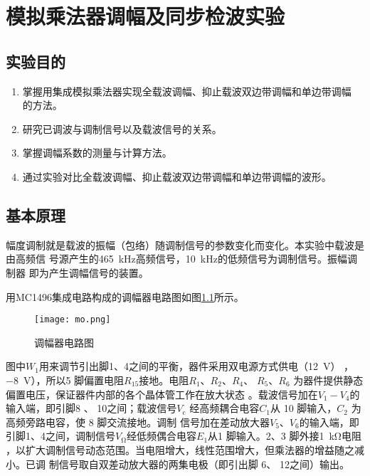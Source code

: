 \documentclass[../main]{subfiles}
\begin{document}
\chapter{模拟乘法器调幅及同步检波实验}%
\label{cha:模拟乘法器调幅及同步检波实验}

\section{实验目的}%
\label{sec:\arabic{chapter}实验目的}

\begin{enumerate}

	\item 掌握用集成模拟乘法器实现全载波调幅、抑止载波双边带调幅和单边带调幅
		的方法。

	\item 研究已调波与调制信号以及载波信号的关系。

	\item 掌握调幅系数的测量与计算方法。

	\item 通过实验对比全载波调幅、抑止载波双边带调幅和单边带调幅的波形。

\end{enumerate}

\section{基本原理}%
\label{sec:\arabic{chapter}基本原理}

幅度调制就是载波的振幅（包络）随调制信号的参数变化而变化。本实验中载波是由高频信
号源产生的\SI{465}{\kHz}高频信号，\SI{10}{\kHz}的低频信号为调制信号。振幅调制器
即为产生调幅信号的装置。

用MC1496集成电路构成的调幅器电路图如图\ref{fig:调幅器电路图}所示。

\begin{figure}[htbp]
	\centering
	\texttt{[image: mo.png]}
	\caption{调幅器电路图}
	\label{fig:调幅器电路图}
\end{figure}

图中$ W_1 $用来调节引出脚1、4之间的平衡，器件采用双电源方式供电（\SI{+12}{\V}）
，\SI{-8}{\V}），所以5 脚偏置电阻$ R_{15} $接地。电阻$ R_1 $、$ R_2 $、$ R_4 $、
$ R_5 $、$ R_6 $ 为器件提供静态偏置电压，保证器件内部的各个晶体管工作在放大状态
。载波信号加在$ V_1 - V_4 $的输入端，即引脚8 、 10之间；载波信号$ V_\mathrm{c} $
经高频耦合电容$ C_1 $从 10 脚输入，$ C_2 $ 为高频旁路电容，使 8 脚交流接地。调制
信号加在差动放大器$ V_5 $、$ V_6 $的输入端，即引脚1、4之间，调制信号$
V_\mathrm{\Omega} $经低频偶合电容$ E_1 $从1 脚输入。2、3 脚外接\SI{1}{\kohm}电阻
，以扩大调制信号动态范围。当电阻增大，线性范围增大，但乘法器的增益随之减小。已调
制信号取自双差动放大器的两集电极（即引出脚 6、 12之间）输出。
\end{document}
